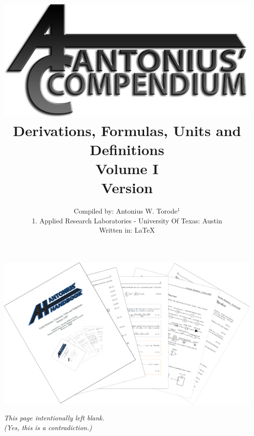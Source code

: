 \documentclass[openany,twoside, notitlepage,letterpaper,11pt]{book}
\title{\includegraphics[scale=2.5]{./Images/Covers/AC.png}
	\\ Derivations, Formulas, Units and Definitions \\ Volume I \\ Version \Version}
\date{}
\author{Compiled by: Antonius W. Torode$^{1}$ \\ \scriptsize{1. Applied Research Laboratories - University Of Texas: Austin} \\ Written in: \LaTeX}
\begin{document}
\frontmatter
\maketitle
\thispagestyle{empty}
\pagestyle{empty}
\begin{center}
	\includegraphics[scale=1.6]{./Images/Covers/background_tunnel.png}
\end{center}





\thispagestyle{empty}
\newpage
{}
\begin{center}
	\textit{This page intentionally left blank.\\ (Yes, this is a contradiction.)}
\end{center}

\tableofcontents


\setlength{\parindent}{0pt}
\mainmatter
\pagestyle{fancy}


\newpage


\newpage


\newpage


\newpage


\newpage


\newpage


\newpage

\end{document}
